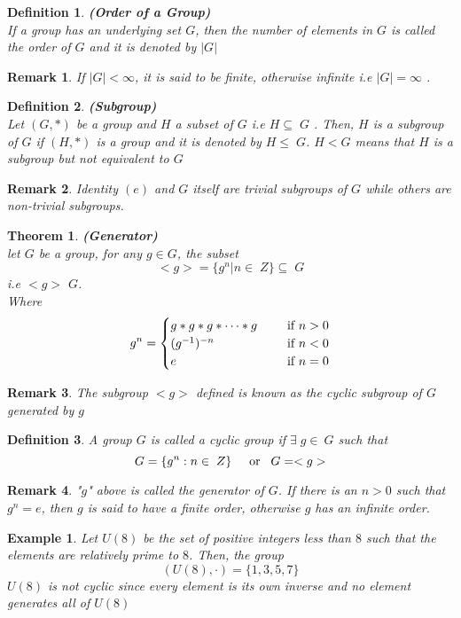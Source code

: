 \documentclass[a4paper, 12pt, openany]{report}
\newtheorem{rmk}{Remark}[section]
\newtheorem{thm}{Theorem}[section]
\newtheorem{defn}{Definition}[section]
\newtheorem{ex}{Example}[section]
\begin{document}
	\begin{defn}\textbf{(Order of a Group)}\\If a group has an underlying set $G$, then the number of elements in $G$ is called the order of $G$ and it is denoted by $|G|$ \end{defn}
	\begin{rmk} If $|G|<\infty$, it is said to be finite, otherwise  infinite i.e \break $|G|=\infty$ .\end{rmk}
	\begin{defn}\textbf{(Subgroup)}\\
		Let $(G,*)$ be a group and $H$ a subset of $G$ i.e  $H\subseteq\;G$ . Then, $H$ is a subgroup of $G$ if $(H,*)$ is a group and  it is denoted by $H\leq\;G$. $H<G$ means that $H$ is a subgroup but not equivalent to $G$\end{defn}
	\begin{rmk}Identity $(e)$ and $G$ itself are trivial subgroups of $G$ while \break others are non-trivial subgroups.\end{rmk}
	\begin{thm}\textbf{(Generator)}\\
		let $G$ be a group, for any $g \in G$, the subset\\ $$<g>=\{g^n|n\in\;Z\}\subseteq\;G$$ i.e $<g>$ $G$.\\Where $$g^n=\begin{cases}
		g*g*g*\cdots*g \hspace{0.5cm}&\mbox{if $n>0$}\\(g^{-1})^{-n}\hspace{0.5cm}& \mbox{if $n<0$}\\e\hspace{0.5cm}&\mbox{if $n=0$}
		\end{cases}$$\end{thm}
	\begin{rmk}The subgroup $<g>$ defined is known as the cyclic subgroup of $G$ generated by $g$\end{rmk}
	\begin{defn}A group $G$ is called a cyclic group if $\exists\;g\in\:G$ such that $$G=\{g^n:n\in\;Z\}\hspace{0.5cm}\mbox{or\hspace{0.3cm}$G=<g>$}$$
\end{defn}
\begin{rmk}"$g$" above is called the generator of $G$. If there is an $n>0$ such that $g^n=e$, then $g$ is said to have a finite order, otherwise $g$ has an infinite order. \end{rmk}
\begin{ex}Let $U(8)$ be the set of positive integers less than $8$ such that the elements are relatively prime to $8$. Then, the group $$(U(8),\cdot)=\{1,3,5,7\}$$ $U(8)$ is not cyclic since every element is its own inverse and no element generates all of $U(8)$\end{ex}
\end{document}
